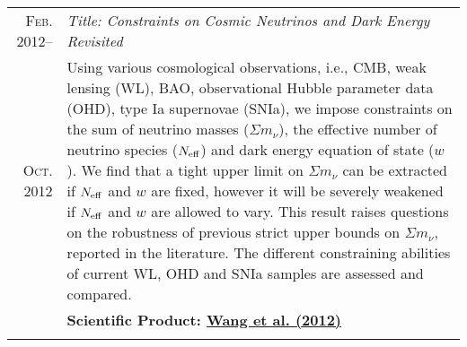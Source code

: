 \documentclass[letterpaper,10pt]{article}
\begin{document}
\begin{longtable}{r|p{5.5in}}
  \textsc{Feb. 2012}--   &   \emph{Title: Constraints on Cosmic Neutrinos and Dark Energy Revisited}  \\
  \textsc{Oct. 2012}     &   \small{Using various cosmological observations, i.e., CMB, weak lensing (WL), BAO, observational Hubble
  parameter data (OHD), type Ia supernovae (SNIa), we impose constraints on the sum of neutrino masses ($\Sigma m_{\nu}$), the
  effective number of neutrino species ($N_{\rm eff}$) and dark energy equation of state ($w$). We find that a tight upper limit
  on $\Sigma m_{\nu}$ can be extracted if $N_{\rm eff}$ and $w$ are fixed, however it will be severely weakened if $N_{\rm eff}$ and
  $w$ are allowed to vary. This result raises questions on the robustness of previous strict upper bounds on $\Sigma m_{\nu}$,
  reported in the literature.
  The different constraining abilities of current WL, OHD and SNIa samples are assessed and compared.}\\
  &   \textbf{Scientific Product: \hyperlink{12.wang.jcap}{Wang et al. (2012)}}  \\
  \multicolumn{2}{c}{} \\

\end{longtable}
\end{document}
